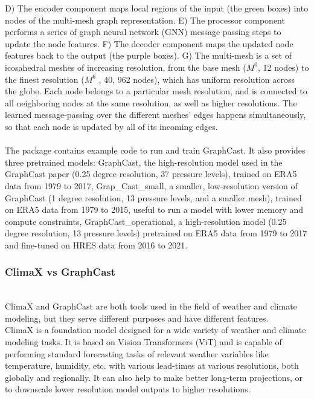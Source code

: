 \documentclass[../paper.tex]{subfiles}
\begin{document}
        D) The encoder component maps local regions of the input (the green boxes) into nodes of the multi-mesh graph representation.
        E) The processor component performs a series of graph neural network (GNN) message passing steps to update the node features.
        F) The decoder component maps the updated node features back to the output (the purple boxes).
        G) The multi-mesh is a set of icosahedral meshes of increasing resolution, from the base mesh ($M^0$, 12 nodes) to the finest resolution ($M^6$ , 40, 962 nodes), which has uniform resolution across the globe.
        Each node belongs to a particular mesh resolution, and is connected to all neighboring nodes at the same resolution, as well as higher resolutions.
        The learned message-passing over the different meshes' edges happens simultaneously, so that each node is updated by all of its incoming edges.
        \\\\
        The package contains example code to run and train GraphCast.
        It also provides three pretrained models: GraphCast, the high-resolution model used in the GraphCast paper (0.25 degree resolution, 37 pressure levels),
        trained on ERA5 data from 1979 to 2017, Grap\_Cast\_small, a smaller, low-resolution version of GraphCast (1 degree resolution,
        13 pressure levels, and a smaller mesh), trained on ERA5 data from 1979 to 2015, useful to run a model with lower memory and compute constraints,
        GraphCast\_operational, a high-resolution model (0.25 degree resolution, 13 pressure levels) pretrained on ERA5 data from 1979 to 2017
        and fine-tuned on HRES data from 2016 to 2021\cite{e2}.
    \subsubsection{ClimaX vs GraphCast}
    \hfill\\
    ClimaX and GraphCast are both tools used in the field of weather and climate modeling, but they serve different purposes and have different features.
    \\
    ClimaX is a foundation model designed for a wide variety of weather and climate modeling tasks.
    It is based on Vision Transformers (ViT) and is capable of performing standard forecasting tasks of relevant weather variables like temperature, humidity, etc.
    with various lead-times at various resolutions, both globally and regionally.
    It can also help to make better long-term projections, or to downscale lower resolution model outputs to higher resolutions.
\end{document}
